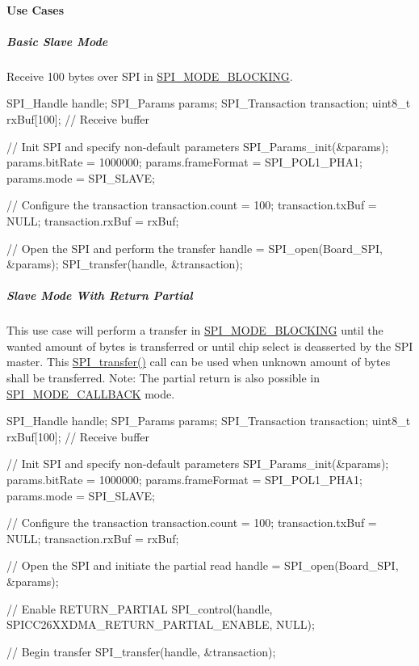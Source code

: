 \paragraph*{Use Cases\label{_s_p_i_c_c26_x_x_d_m_a_8h_USE_CASES_SPI}%
\hypertarget{_s_p_i_c_c26_x_x_d_m_a_8h_USE_CASES_SPI}{}%
}

\subparagraph*{Basic Slave Mode}

Receive 100 bytes over S\+P\+I in \hyperlink{_s_p_i_8h_ab9ea76c6529d6076eee5e1c4a5a92c6fa0dfb2358e008316426895e7237c398e8}{S\+P\+I\+\_\+\+M\+O\+D\+E\+\_\+\+B\+L\+O\+C\+K\+I\+N\+G}. 
\begin{DoxyCode}
SPI_Handle handle;
SPI_Params params;
SPI_Transaction transaction;
uint8\_t rxBuf[100];     \textcolor{comment}{// Receive buffer}

\textcolor{comment}{// Init SPI and specify non-default parameters}
SPI_Params_init(&params);
params.bitRate     = 1000000;
params.frameFormat = SPI_POL1_PHA1;
params.mode        = SPI_SLAVE;

\textcolor{comment}{// Configure the transaction}
transaction.count = 100;
transaction.txBuf = NULL;
transaction.rxBuf = rxBuf;

\textcolor{comment}{// Open the SPI and perform the transfer}
handle = SPI_open(Board\_SPI, &params);
SPI_transfer(handle, &transaction);
\end{DoxyCode}


\subparagraph*{Slave Mode With Return Partial\label{_s_p_i_c_c26_x_x_d_m_a_8h_USE_CASE_RP}%
\hypertarget{_s_p_i_c_c26_x_x_d_m_a_8h_USE_CASE_RP}{}%
}

This use case will perform a transfer in \hyperlink{_s_p_i_8h_ab9ea76c6529d6076eee5e1c4a5a92c6fa0dfb2358e008316426895e7237c398e8}{S\+P\+I\+\_\+\+M\+O\+D\+E\+\_\+\+B\+L\+O\+C\+K\+I\+N\+G} until the wanted amount of bytes is transferred or until chip select is deasserted by the S\+P\+I master. This \hyperlink{_s_p_i_8h_a989e17f96b54fcc3dc2cac5f8ac6bdb2}{S\+P\+I\+\_\+transfer()} call can be used when unknown amount of bytes shall be transferred. Note\+: The partial return is also possible in \hyperlink{_s_p_i_8h_ab9ea76c6529d6076eee5e1c4a5a92c6fa5631e69925c47a62a261c78ebbda39fb}{S\+P\+I\+\_\+\+M\+O\+D\+E\+\_\+\+C\+A\+L\+L\+B\+A\+C\+K} mode. 
\begin{DoxyCode}
SPI_Handle handle;
SPI_Params params;
SPI_Transaction transaction;
uint8\_t rxBuf[100];     \textcolor{comment}{// Receive buffer}

\textcolor{comment}{// Init SPI and specify non-default parameters}
SPI_Params_init(&params);
params.bitRate     = 1000000;
params.frameFormat = SPI_POL1_PHA1;
params.mode        = SPI_SLAVE;

\textcolor{comment}{// Configure the transaction}
transaction.count = 100;
transaction.txBuf = NULL;
transaction.rxBuf = rxBuf;

\textcolor{comment}{// Open the SPI and initiate the partial read}
handle = SPI_open(Board\_SPI, &params);

\textcolor{comment}{// Enable RETURN\_PARTIAL}
SPI_control(handle, SPICC26XXDMA_RETURN_PARTIAL_ENABLE, NULL);

\textcolor{comment}{// Begin transfer}
SPI_transfer(handle, &transaction);
\end{DoxyCode}


